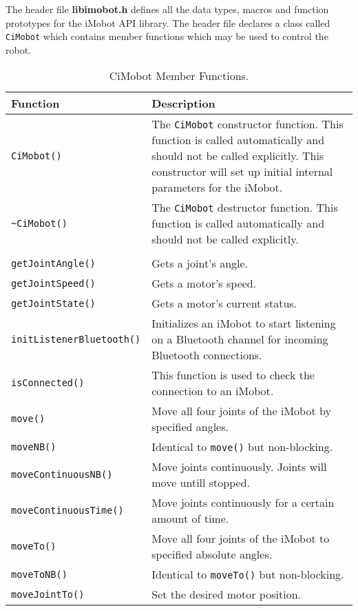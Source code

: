 \noindent
The header file {\bf libimobot.h} defines all the data types, macros 
and function prototypes for the iMobot API library. The header file
declares a class called \texttt{CiMobot} which contains member functions which
may be used to control the robot.

\begin{table}[!hp]
\capstart
\begin{center}
\caption{CiMobot Member Functions.}
\begin{tabular}{p{58 mm}p{97 mm}}
\hline
Function & Description \\
\hline
\texttt{CiMobot()} & The \texttt{CiMobot} constructor function. This function
is called automatically and should not be called explicitly. This constructor will 
set up initial internal parameters for the iMobot. \\
\texttt{\textasciitilde CiMobot()} & The \texttt{CiMobot} destructor function. This function
is called automatically and should not be called explicitly. \\
& \\
\texttt{getJointAngle()} & Gets a joint's angle. \\
\texttt{getJointSpeed()} & Gets a motor's speed. \\
\texttt{getJointState()} & Gets a motor's current status. \\
\texttt{initListenerBluetooth()} & Initializes an iMobot to start listening on
a Bluetooth channel for incoming Bluetooth connections. \\
\texttt{isConnected()} & This function is used to check the connection to an iMobot. \\
\texttt{move()} & Move all four joints of the iMobot by specified angles. \\
\texttt{moveNB()} & Identical to \texttt{move()} but non-blocking. \\
\texttt{moveContinuousNB()} & Move joints continuously. Joints will move untill stopped.\\
\texttt{moveContinuousTime()} & Move joints continuously for a certain amount of time.\\
\texttt{moveTo()} & Move all four joints of the iMobot to specified absolute angles. \\
\texttt{moveToNB()} & Identical to \texttt{moveTo()} but non-blocking. \\
\texttt{moveJointTo()} & Set the desired motor position. \\

\end{tabular}
\end{center}
\end{table}
